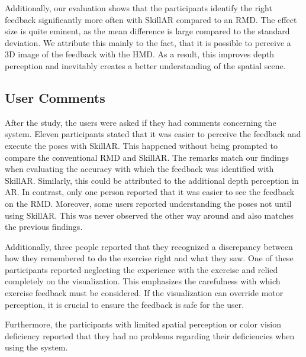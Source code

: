 Additionally, our evaluation shows that the participants identify the right feedback significantly more often with SkillAR compared to an RMD. The effect size is quite eminent, as the mean difference is large compared to the standard deviation. We attribute this mainly to the fact, that it is possible to perceive a 3D image of the feedback with the HMD. As a result, this improves depth perception and inevitably creates a better understanding of the spatial scene.

\subsection{User Comments \label{sec:comments}}
After the study, the users were asked if they had comments concerning the system. Eleven participants stated that it was easier to perceive the feedback and execute the poses with SkillAR. This happened without being prompted to compare the conventional RMD and SkillAR. The remarks match our findings when evaluating the accuracy with which the feedback was identified with SkillAR. Similarly, this could be attributed to the additional depth perception in AR. In contrast, only one person reported that it was easier to see the feedback on the RMD. Moreover, some users reported understanding the poses not until using SkillAR. This was never observed the other way around and also matches the previous findings.

Additionally, three people reported that they recognized a discrepancy between how they remembered to do the exercise right and what they saw. One of these participants reported neglecting the experience with the exercise and relied completely on the visualization. This emphasizes the carefulness with which exercise feedback must be considered. If the visualization can override motor perception, it is crucial to ensure the feedback is safe for the user.

Furthermore, the participants with limited spatial perception or color vision deficiency reported that they had no problems regarding their deficiencies when using the system.

